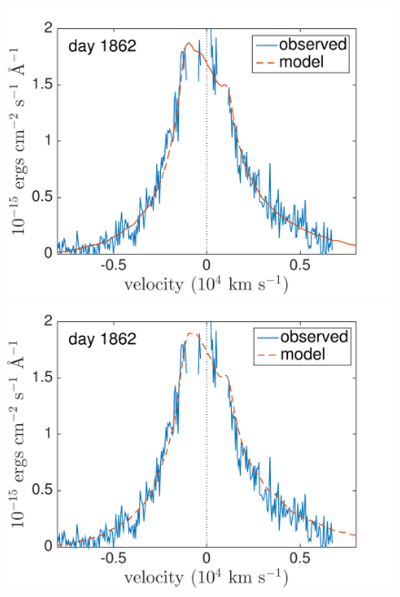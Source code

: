 \begin{figure}
\centering
\includegraphics[trim =0 35 20 0,clip=true,scale=0.39]{chapters/chapter5/images/clump_1/best_fit/d1862Ha.pdf}
\includegraphics[trim =30 35 0 0,clip=true,scale=0.39]{chapters/chapter5/images/clump_1/maximum/d1862Ha.pdf}


\end{figure}
